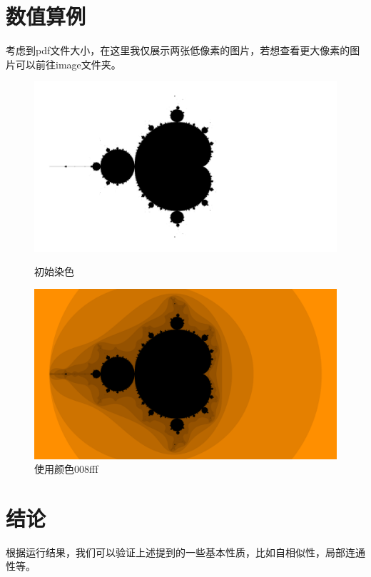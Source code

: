 \documentclass[UTF8]{ctexart}
\begin{document}
\section{数值算例}
考虑到pdf文件大小，在这里我仅展示两张低像素的图片，若想查看更大像素的图片可以前往image文件夹。
\begin{figure}[H]
	\centering
	\begin{minipage}{0.48\textwidth}
		\centering
		\includegraphics[width=1\linewidth]{../image/tmp_origin.png}
		\caption{初始染色}
	\end{minipage}
	\begin{minipage}{0.48\textwidth}
		\centering
		\includegraphics[width=1\linewidth]{../image/tmp_colored.png}
		\caption{使用颜色008fff}
	\end{minipage}
\end{figure}
\section{结论}
根据运行结果，我们可以验证上述提到的一些基本性质，比如自相似性，局部连通性等。


\end{document}
